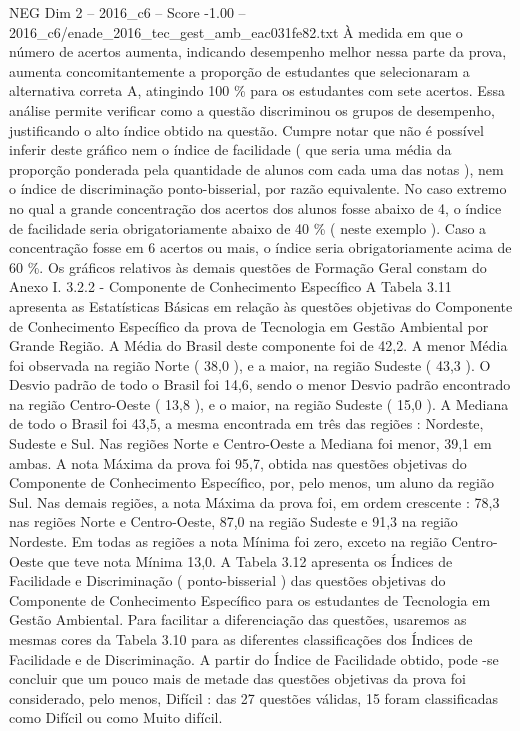 \begin{textsample}{NEG Dim 2 – 2016\_c6 – Score -1.00 – 2016\_c6/enade\_2016\_tec\_gest\_amb\_eac031fe82.txt}
À medida em que o número de acertos aumenta, indicando desempenho melhor nessa parte da prova, aumenta concomitantemente a proporção de estudantes que selecionaram a alternativa correta A, atingindo 100 \% para os estudantes com sete acertos.
Essa análise permite verificar como a questão discriminou os grupos de desempenho, justificando o alto índice obtido na questão.
Cumpre notar que não é possível inferir deste gráfico nem o índice de facilidade ( que seria uma média da proporção ponderada pela quantidade de alunos com cada uma das notas ), nem o índice de discriminação ponto-bisserial, por razão equivalente.
No caso extremo no qual a grande concentração dos acertos dos alunos fosse abaixo de 4, o índice de facilidade seria obrigatoriamente abaixo de 40 \% ( neste exemplo ).
Caso a concentração fosse em 6 acertos ou mais, o índice seria obrigatoriamente acima de 60 \%.
Os gráficos relativos às demais questões de Formação Geral constam do Anexo I. 3.2.2 - Componente de Conhecimento Específico A Tabela 3.11 apresenta as Estatísticas Básicas em relação às questões objetivas do Componente de Conhecimento Específico da prova de Tecnologia em Gestão Ambiental por Grande Região.
A Média do Brasil deste componente foi de 42,2.
A menor Média foi observada na região Norte ( 38,0 ), e a maior, na região Sudeste ( 43,3 ).
O Desvio padrão de todo o Brasil foi 14,6, sendo o menor Desvio padrão encontrado na região Centro-Oeste ( 13,8 ), e o maior, na região Sudeste ( 15,0 ).
A Mediana de todo o Brasil foi 43,5, a mesma encontrada em três das regiões : Nordeste, Sudeste e Sul.
Nas regiões Norte e Centro-Oeste a Mediana foi menor, 39,1 em ambas.
A nota Máxima da prova foi 95,7, obtida nas questões objetivas do Componente de Conhecimento Específico, por, pelo menos, um aluno da região Sul.
Nas demais regiões, a nota Máxima da prova foi, em ordem crescente : 78,3 nas regiões Norte e Centro-Oeste, 87,0 na região Sudeste e 91,3 na região Nordeste.
Em todas as regiões a nota Mínima foi zero, exceto na região Centro-Oeste que teve nota Mínima 13,0.
A Tabela 3.12 apresenta os Índices de Facilidade e Discriminação ( ponto-bisserial ) das questões objetivas do Componente de Conhecimento Específico para os estudantes de Tecnologia em Gestão Ambiental.
Para facilitar a diferenciação das questões, usaremos as mesmas cores da Tabela 3.10 para as diferentes classificações dos Índices de Facilidade e de Discriminação.
A partir do Índice de Facilidade obtido, pode -se concluir que um pouco mais de metade das questões objetivas da prova foi considerado, pelo menos, Difícil : das 27 questões válidas, 15 foram classificadas como Difícil ou como Muito difícil.

\end{textsample}
